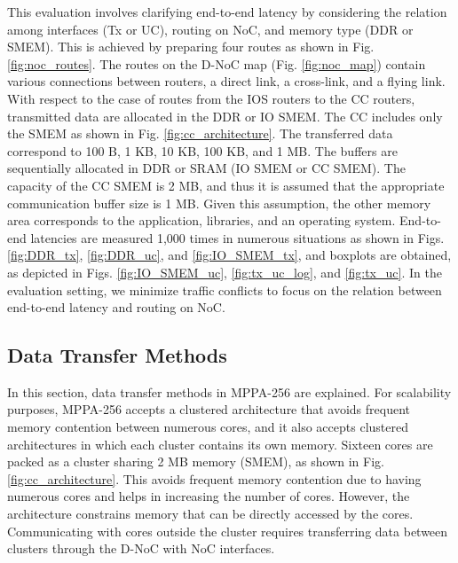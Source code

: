 This evaluation involves clarifying end-to-end latency by considering the relation among interfaces (Tx or UC), routing on NoC, and memory type (DDR or SMEM).
This is achieved by preparing four routes as shown in Fig. \ref{fig:noc_routes}.
The routes on the D-NoC map (Fig. \ref{fig:noc_map}) contain various connections between routers, a direct link, a cross-link, and a flying link.
With respect to the case of routes from the IOS routers to the CC routers, transmitted data are allocated in the DDR or IO SMEM.
The CC includes only the SMEM as shown in Fig. \ref{fig:cc_architecture}.
The transferred data correspond to 100 B, 1 KB, 10 KB, 100 KB, and 1 MB.
The buffers are sequentially allocated in DDR or SRAM (IO SMEM or CC SMEM).
The capacity of the CC SMEM is 2 MB, and thus it is assumed that the appropriate communication buffer size is 1 MB.
Given this assumption, the other memory area corresponds to the application, libraries, and an operating system.
End-to-end latencies are measured 1,000 times in numerous situations as shown in Figs. \ref{fig:DDR_tx}, \ref{fig:DDR_uc}, and \ref{fig:IO_SMEM_tx}, and boxplots are obtained, as depicted in Figs. \ref{fig:IO_SMEM_uc}, \ref{fig:tx_uc_log}, and \ref{fig:tx_uc}.
In the evaluation setting, we minimize traffic conflicts to focus on the relation between end-to-end latency and routing on NoC.



\subsection{Data Transfer Methods}
\label{sec:data_transfer_methods}

In this section, data transfer methods in MPPA-256 are explained.
For scalability purposes, MPPA-256 accepts a clustered architecture that avoids frequent memory contention between numerous cores, and it also accepts clustered architectures in which each cluster contains its own memory.
Sixteen cores are packed as a cluster sharing 2 MB memory (SMEM), as shown in Fig. \ref{fig:cc_architecture}.
This avoids frequent memory contention due to having numerous cores and helps in increasing the number of cores.
However, the architecture constrains memory that can be directly accessed by the cores.
Communicating with cores outside the cluster requires transferring data between clusters through the D-NoC with NoC interfaces.

